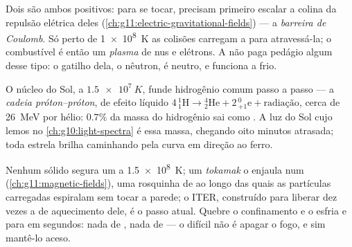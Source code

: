 \begin{definition}\label{def:g12:nuclear-energy:barrier}
Dois  são ambos positivos: para se tocar, precisam primeiro escalar a colina da
repulsão elétrica deles (\cref{ch:g11:electric-gravitational-fields}) --- a
\emph{barreira de Coulomb}. Só perto de \qty{1e8}{K} as
colisões carregam a  para atravessá-la; o combustível é então um
\emph{plasma} de  nus e elétrons. A  não paga pedágio algum
desse tipo: o gatilho dela, o nêutron, é neutro, e funciona a frio.
\end{definition}

\begin{example}\label{ex:g12:nuclear-energy:sun}
O núcleo do Sol, a $\qty{1.5e7}{K}$, funde hidrogênio comum passo a passo --- a
\emph{cadeia próton--próton}, de efeito líquido
$4\,{}^{1}_{1}\mathrm{H} \to {}^{4}_{2}\mathrm{He} + 2\,{}^{0}_{+1}\mathrm{e}
+ \text{radiação}$, cerca de \qty{26}{MeV} por hélio: $0.7\%$ da massa do hidrogênio sai
como . A luz do Sol cujo  lemos no \cref{ch:g10:light-spectra} é essa
massa, chegando oito minutos atrasada; toda estrela brilha caminhando pela curva em
direção ao ferro.
\end{example}

\begin{remark}\label{rem:g12:nuclear-energy:iter}
Nenhum sólido segura um  a \qty{1.5e8}{K}; um \emph{tokamak} o enjaula num  (\cref{ch:g11:magnetic-fields}), uma rosquinha de  ao longo das
quais as partículas carregadas espiralam sem tocar a parede; o ITER, construído para
liberar dez vezes a  de aquecimento dele, é o passo atual. Quebre o confinamento
e o  esfria e para em segundos: nada de , nada de  ---
o difícil não é apagar o fogo, e sim mantê-lo aceso.
\end{remark}

